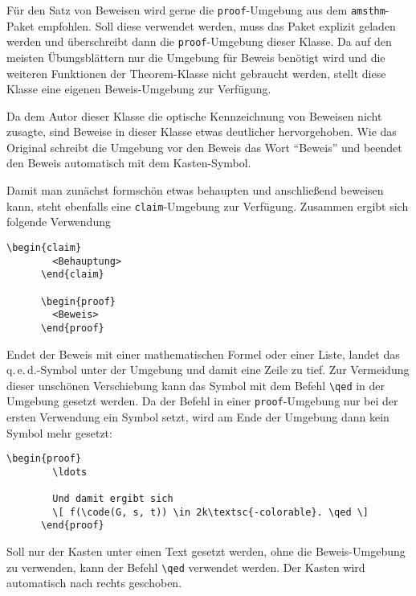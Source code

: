 \documentclass{exercise}
\begin{document}
    Für den Satz von Beweisen wird gerne die \lstinline{proof}-Umgebung aus dem \texttt{amsthm}-Paket \cite{amsthm} empfohlen. Soll diese verwendet werden, muss das Paket explizit geladen werden und überschreibt dann die \lstinline{proof}-Umgebung dieser Klasse. Da auf den meisten Übungsblättern nur die Umgebung für Beweis benötigt wird und die weiteren Funktionen der Theorem-Klasse nicht gebraucht werden, stellt diese Klasse eine eigenen Beweis-Umgebung zur Verfügung.
    
    Da dem Autor dieser Klasse die optische Kennzeichnung von Beweisen nicht zusagte, sind Beweise in dieser Klasse etwas deutlicher hervorgehoben. Wie das Original schreibt die Umgebung vor den Beweis das Wort \enquote{Beweis} und beendet den Beweis automatisch mit dem Kasten-Symbol.
    
    Damit man zunächst formschön etwas behaupten und anschließend beweisen kann, steht ebenfalls eine \lstinline{claim}-Umgebung zur Verfügung. Zusammen ergibt sich folgende Verwendung
    \begin{lstlisting}[gobble=6]
      \begin{claim}
        <Behauptung>
      \end{claim}
      
      \begin{proof}
        <Beweis>
      \end{proof}
    \end{lstlisting}
    
    Endet der Beweis mit einer mathematischen Formel oder einer Liste, landet das q.\,e.\,d.-Symbol unter der Umgebung und damit eine Zeile zu tief. Zur Vermeidung dieser unschönen Verschiebung kann das Symbol mit dem Befehl \lstinline-\qed- in der Umgebung gesetzt werden. Da der Befehl in einer \lstinline{proof}-Umgebung nur bei der ersten Verwendung ein Symbol setzt, wird am Ende der Umgebung dann kein Symbol mehr gesetzt:
    \begin{lstlisting}[gobble=6]
      \begin{proof}
        \ldots
        
        Und damit ergibt sich
        \[ f(\code(G, s, t)) \in 2k\textsc{-colorable}. \qed \]
      \end{proof}
    \end{lstlisting}
    
  Soll nur der Kasten unter einen Text gesetzt werden, ohne die Beweis-Umgebung zu verwenden, kann der Befehl \lstinline-\qed- verwendet werden. Der Kasten wird automatisch nach rechts geschoben.
    
\end{document}
